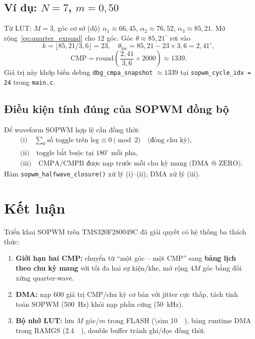 \documentclass[12pt,a4paper]{article}
\begin{document}
\subsection{Ví dụ: $N=7$, $m=0{,}50$}

Từ LUT: $M=3$, góc cơ sở (độ) $\alpha_1 \approx 66{,}45$, $\alpha_2 \approx 76{,}52$, $\alpha_3 \approx 85{,}21$. Mở rộng~\eqref{eq:quarter_expand} cho $12$ góc. Góc $\theta \approx 85{,}21^\circ$ rơi vào
\[
  k = \lfloor 85{,}21 / 3{,}6 \rfloor = 23, \quad
  \theta_{\mathrm{loc}} = 85{,}21 - 23 \times 3{,}6 = 2{,}41^\circ,
\]
\[
  \mathrm{CMP} = \mathrm{round}\!\left(\frac{2{,}41}{3{,}6} \times 2000\right) \approx 1339.
\]
Giá trị này khớp biến debug \texttt{dbg\_cmpa\_snapshot} $\approx 1339$ tại \texttt{sopwm\_cycle\_idx = 24} trong \texttt{main.c}.

\subsection{Điều kiện tính đúng của SOPWM đồng bộ}

Để waveform SOPWM hợp lệ cần đồng thời:
\begin{align}
  &\text{(i)}\quad \sum_k \text{số toggle trên leg} \equiv 0 \pmod 2 \quad \text{(đóng chu kỳ)}, \\
  &\text{(ii)}\quad \text{toggle bắt buộc tại } 180^\circ \text{ mỗi pha}, \\
  &\text{(iii)}\quad \text{CMPA/CMPB được nạp trước mỗi chu kỳ mang (DMA @ ZERO)}.
\end{align}
Hàm \texttt{sopwm\_halfwave\_closure()} xử lý (i)--(ii); DMA xử lý (iii).

\section{Kết luận}

Triển khai SOPWM trên TMS320F280049C đã giải quyết có hệ thống ba thách thức:

\begin{enumerate}
  \item \textbf{Giới hạn hai CMP:} chuyển từ ``một góc -- một CMP'' sang \textbf{bảng lịch theo chu kỳ mang} với tối đa hai sự kiện/khe, mở rộng $4M$ góc bằng đối xứng quarter-wave.
  \item \textbf{DMA:} nạp 600 giá trị CMP/chu kỳ cơ bản với jitter cực thấp, tách tính toán SOPWM (\SI{500}{\hertz}) khỏi nạp phần cứng (\SI{50}{\kilo\hertz}).
  \item \textbf{Bộ nhớ LUT:} lưu $M$ góc/$m$ trong FLASH (\SI{\sim 10}{\kibi\byte}), bảng runtime DMA trong RAMGS (\SI{2.4}{\kibi\byte}), double buffer tránh ghi/đọc đồng thời.
\end{enumerate}
\end{document}
